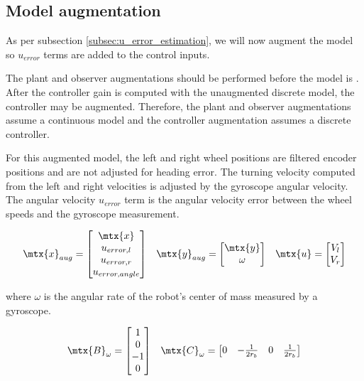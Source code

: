 \subsection{Model augmentation}

As per subsection \ref{subsec:u_error_estimation}, we will now augment the
\gls{model} so $u_{error}$ terms are added to the \glspl{control input}.

The \gls{plant} and \gls{observer} augmentations should be performed before the
\gls{model} is . After the \gls{controller}
gain is computed with the unaugmented discrete \gls{model}, the controller may
be augmented. Therefore, the \gls{plant} and \gls{observer} augmentations assume
a continuous \gls{model} and the \gls{controller} augmentation assumes a
discrete \gls{controller}.

For this augmented \gls{model}, the left and right wheel positions are filtered
encoder positions and are not adjusted for heading error. The turning velocity
computed from the left and right velocities is adjusted by the gyroscope angular
velocity. The angular velocity $u_{error}$ term is the angular velocity error
between the wheel speeds and the gyroscope measurement.

\begin{equation*}
  \begin{array}{ccc}
    \mtx{x}_{aug} =
    \begin{bmatrix}
      \mtx{x} \\
      u_{error,l} \\
      u_{error,r} \\
      u_{error,angle}
    \end{bmatrix} &
    \mtx{y}_{aug} =
    \begin{bmatrix}
      \mtx{y} \\
      \omega
    \end{bmatrix} &
    \mtx{u} =
    \begin{bmatrix}
      V_l \\
      V_r
    \end{bmatrix}
  \end{array}
\end{equation*}

where $\omega$ is the angular rate of the robot's center of mass measured by a
gyroscope.

\begin{equation*}
  \begin{array}{cc}
    \mtx{B}_{\omega} =
    \begin{bmatrix}
      1 \\
      0 \\
      -1 \\
      0
    \end{bmatrix} &
    \mtx{C}_{\omega} =
    \begin{bmatrix}
      0 & -\frac{1}{2r_b} & 0 & \frac{1}{2r_b}
    \end{bmatrix}
  \end{array}
\end{equation*}

